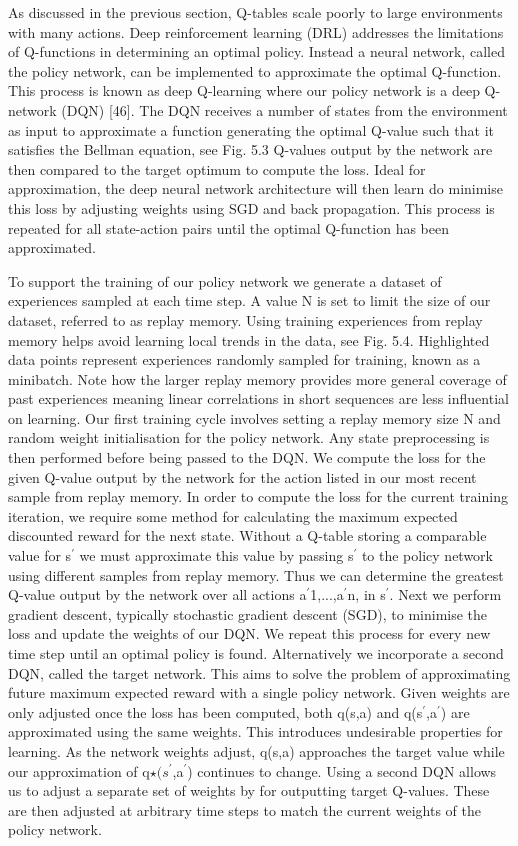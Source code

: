 \documentclass[runningheads]{llncs}
\begin{document}
As discussed in the previous section, Q-tables scale poorly to large environments with
many actions. Deep reinforcement learning (DRL) addresses the limitations of Q-functions
in determining an optimal policy. Instead a neural network, called the policy network, can
be implemented to approximate the optimal Q-function. This process is known as deep
Q-learning where our policy network is a deep Q-network (DQN) [46]. The DQN receives
a number of states from the environment as input to approximate a function generating the
optimal Q-value such that it satisfies the Bellman equation, see Fig. 5.3 Q-values output
by the network are then compared to the target optimum to compute the loss. Ideal for
approximation, the deep neural network architecture will then learn do minimise this loss
by adjusting weights using SGD and back propagation. This process is repeated for all
state-action pairs until the optimal Q-function has been approximated.

To support the training of our policy network we generate a dataset of experiences
sampled at each time step. A value N is set to limit the size of our dataset, referred
to as replay memory. Using training experiences from replay memory helps avoid learning local trends in
the data, see Fig. 5.4. Highlighted data points represent experiences randomly sampled
for training, known as a minibatch. Note how the larger replay memory provides more
general coverage of past experiences meaning linear correlations in short sequences are
less influential on learning. Our first training cycle involves setting a replay memory size
N and random weight initialisation for the policy network. Any state preprocessing is then
performed before being passed to the DQN. We compute the loss for the given Q-value
output by the network for the action listed in our most recent sample from replay memory.
In order to compute the loss for the current training iteration, we require some method for
calculating the maximum expected discounted reward for the next state. Without a Q-table
storing a comparable value for s$^{\prime}$ we must approximate this value by passing s$^{\prime}$ to the
policy network using different samples from replay memory. Thus we can determine the
greatest Q-value output by the network over all actions a$^{\prime}$1,...,a$^{\prime}$n, in s$^{\prime}$. Next we perform
gradient descent, typically stochastic gradient descent (SGD), to minimise the loss and
update the weights of our DQN. We repeat this process for every new time step until an
optimal policy is found. Alternatively we incorporate a second DQN, called the target network. This aims to
solve the problem of approximating future maximum expected reward with a single policy
network. Given weights are only adjusted once the loss has been computed, both q(s,a)
and q(s$^{\prime}$,a$^{\prime}$) are approximated using the same weights. This introduces undesirable properties for learning. As the network weights adjust, q(s,a) approaches the target value
while our approximation of q$\star(s^{\prime}$,a$^{\prime}$) continues to change. Using a second DQN allows
us to adjust a separate set of weights by for outputting target Q-values. These are then
adjusted at arbitrary time steps to match the current weights of the policy network.
\end{document}
